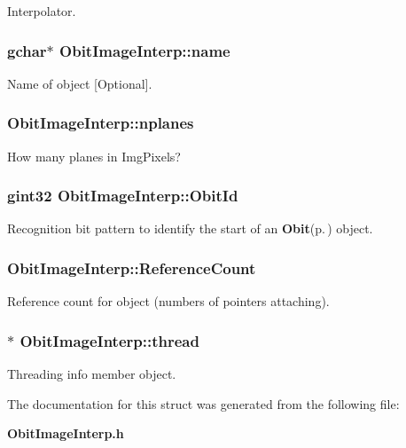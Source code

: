 Interpolator. 

\subsubsection{\setlength{\rightskip}{0pt plus 5cm}gchar$\ast$ {\bf Obit\-Image\-Interp::name}}\label{structObitImageInterp_o3}


Name of object [Optional]. 

\subsubsection{ {\bf Obit\-Image\-Interp::nplanes}}\label{structObitImageInterp_o10}


How many planes in Img\-Pixels? 

\subsubsection{\setlength{\rightskip}{0pt plus 5cm}gint32 {\bf Obit\-Image\-Interp::Obit\-Id}}\label{structObitImageInterp_o0}


Recognition bit pattern to identify the start of an {\bf Obit}{\rm (p.\,\pageref{structObit})} object. 

\subsubsection{ {\bf Obit\-Image\-Interp::Reference\-Count}}\label{structObitImageInterp_o2}


Reference count for object (numbers of pointers attaching). 

\subsubsection{$\ast$ {\bf Obit\-Image\-Interp::thread}}\label{structObitImageInterp_o4}


Threading info member object. 



The documentation for this struct was generated from the following file:\begin{CompactItemize}
\item 
{\bf Obit\-Image\-Interp.h}\end{CompactItemize}
